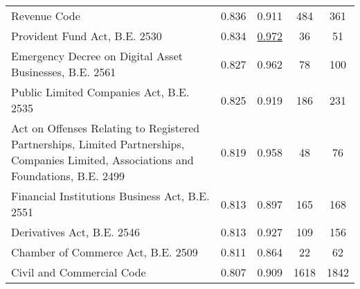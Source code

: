 \begin{table}[]
{\begin{tabular}{@{}p{}cccc@{}}
Revenue Code                                                                                                                          & 0.836                            & 0.911                         & 484                         & 361                               \\
Provident Fund Act, B.E. 2530                                                                                                         & 0.834                            & \underline{0.972}                   & 36                          & 51                                \\
Emergency Decree on Digital Asset Businesses, B.E. 2561                                                                               & 0.827                            & 0.962                         & 78                          & 100                               \\
Public Limited Companies Act, B.E. 2535                                                                                               & 0.825                            & 0.919                         & 186                         & 231                               \\
Act on Offenses Relating to Registered Partnerships, Limited Partnerships, Companies Limited, Associations and Foundations, B.E. 2499 & 0.819                            & 0.958                         & 48                          & 76                                \\
Financial Institutions Business Act, B.E. 2551                                                                                        & 0.813                            & 0.897                         & 165                         & 168                               \\
Derivatives Act, B.E. 2546                                                                                                            & 0.813                            & 0.927                         & 109                         & 156                               \\
Chamber of Commerce Act, B.E. 2509                                                                                                    & 0.811                            & 0.864                         & 22                          & 62                                \\
Civil and Commercial Code                                                                                                             & 0.807                            & 0.909                         & 1618                        & 1842                              \\

\end{tabular}}
\end{table}
